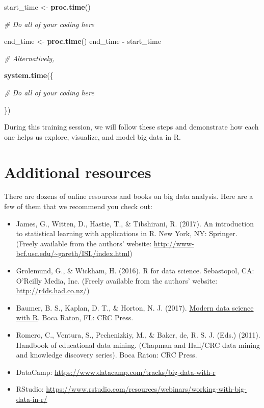 \documentclass[]{book}
\newenvironment{Shaded}{\begin{snugshade}}{\end{snugshade}}
\newcommand{\CommentTok}[1]{\textcolor[rgb]{0.56,0.35,0.01}{\textit{#1}}}
\newcommand{\KeywordTok}[1]{\textcolor[rgb]{0.13,0.29,0.53}{\textbf{#1}}}
\newcommand{\NormalTok}[1]{#1}
\newcommand{\OperatorTok}[1]{\textcolor[rgb]{0.81,0.36,0.00}{\textbf{#1}}}
\newcommand{\StringTok}[1]{\textcolor[rgb]{0.31,0.60,0.02}{#1}}
\begin{document}
\begin{Shaded}
\begin{Highlighting}[]
\NormalTok{start_time <-}\StringTok{ }\KeywordTok{proc.time}\NormalTok{()}

\CommentTok{# Do all of your coding here}

\NormalTok{end_time <-}\StringTok{ }\KeywordTok{proc.time}\NormalTok{()}
\NormalTok{end_time }\OperatorTok{-}\StringTok{ }\NormalTok{start_time}

\CommentTok{# Alternatively,}

\KeywordTok{system.time}\NormalTok{(\{}
  
 \CommentTok{# Do all of your coding here }
  
\NormalTok{\})}
\end{Highlighting}
\end{Shaded}

During this training session, we will follow these steps and demonstrate how each one helps us explore, visualize, and model big data in R.

\hypertarget{additional-resources}{%
\section{Additional resources}\label{additional-resources}}

There are dozens of online resources and books on big data analysis. Here are a few of them that we recommend you check out:

\begin{itemize}
\item
  James, G., Witten, D., Hastie, T., \& Tibshirani, R. (2017). An introduction to statistical learning with applications in R. New York, NY: Springer. (Freely available from the authors' website: \url{http://www-bcf.usc.edu/~gareth/ISL/index.html})
\item
  Grolemund, G., \& Wickham, H. (2016). R for data science. Sebastopol, CA: O'Reilly Media, Inc. (Freely available from the authors' website: \url{http://r4ds.had.co.nz/})
\item
  Baumer, B. S., Kaplan, D. T., \& Horton, N. J. (2017). \href{https://mdsr-book.github.io/}{Modern data science with R}. Boca Raton, FL: CRC Press.
\item
  Romero, C., Ventura, S., Pechenizkiy, M., \& Baker, de, R. S. J. (Eds.) (2011). Handbook of educational data mining. (Chapman and Hall/CRC data mining and knowledge discovery series). Boca Raton: CRC Press.
\item
  DataCamp: \url{https://www.datacamp.com/tracks/big-data-with-r}
\item
  RStudio: \url{https://www.rstudio.com/resources/webinars/working-with-big-data-in-r/}
\end{itemize}
\end{document}
